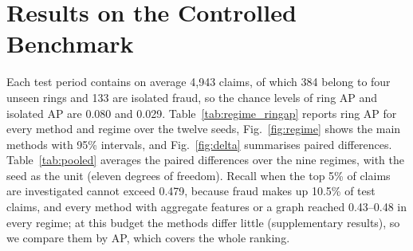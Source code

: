 \documentclass[pdflatex,sn-vancouver-num]{sn-jnl}
\begin{document}
\section{Results on the Controlled Benchmark}\label{sec:results}

Each test period contains on average 4{,}943 claims, of which 384 belong to
four unseen rings and 133 are isolated fraud, so the chance levels of ring AP
and isolated AP are 0.080 and 0.029. Table~\ref{tab:regime_ringap} reports
ring AP for every method and regime over the twelve seeds,
Fig.~\ref{fig:regime} shows the main methods with 95\% intervals, and
Fig.~\ref{fig:delta} summarises paired differences. Table~\ref{tab:pooled}
averages the paired differences over the nine regimes, with the seed as the
unit (eleven degrees of freedom). Recall when the top 5\% of claims are
investigated cannot exceed 0.479, because fraud makes up 10.5\% of test
claims, and every method with aggregate features or a graph reached
0.43--0.48 in every regime; at this budget the methods differ little
(supplementary results), so we compare them by AP, which covers the whole
ranking.
\end{document}
